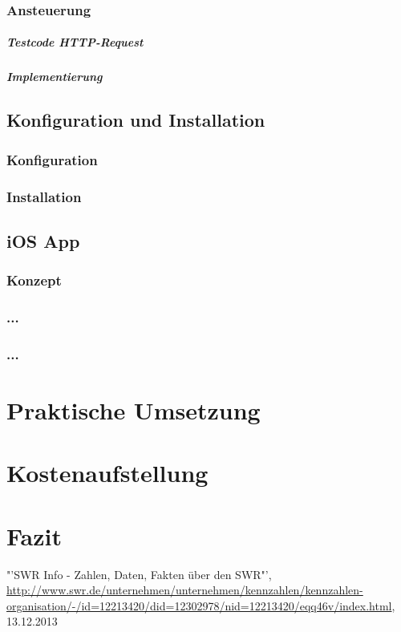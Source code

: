 \subsection{Ansteuerung}
\paragraph{Testcode HTTP-Request}
\paragraph{Implementierung}

\section{Konfiguration und Installation}
\subsection{Konfiguration}
\subsection{Installation}

\section{iOS App}
\subsection{Konzept}
\subsection{...}
\subsection{...}

\chapter{Praktische Umsetzung}

\chapter{Kostenaufstellung}

\chapter{Fazit}

\listoffigures

\begin{thebibliography}{xxxxxxxxxxxxxxxxxxx}
 "'SWR Info - Zahlen, Daten, Fakten über den SWR"', \url{http://www.swr.de/unternehmen/unternehmen/kennzahlen/kennzahlen-organisation/-/id=12213420/did=12302978/nid=12213420/eqq46v/index.html}, 13.12.2013
\end{thebibliography}

 

 